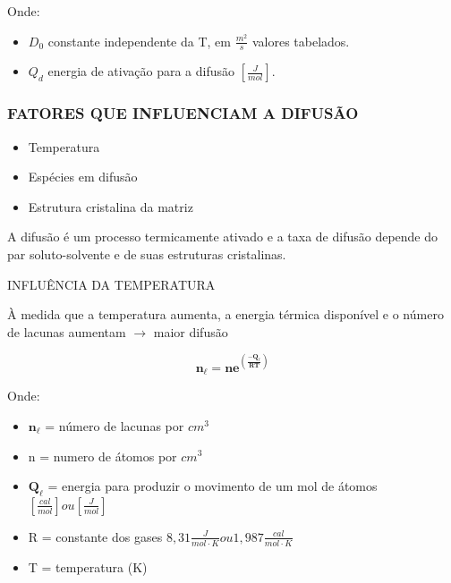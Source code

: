 Onde:


\begin{itemize}
	\item $D_{0}$ constante independente da T, em $\frac{m^{2}}{s}$ valores tabelados.
	\item $Q_{d}$ energia de ativação para a difusão $[\frac{J}{mol}]$.
\end{itemize}

\subsubsection{FATORES QUE INFLUENCIAM A DIFUSÃO}


\begin{itemize}
	\item Temperatura
	\item Espécies em difusão
	\item Estrutura cristalina da matriz
\end{itemize}

A difusão é um processo termicamente ativado e a taxa de difusão depende do par soluto-solvente e de suas estruturas cristalinas.


INFLUÊNCIA DA TEMPERATURA

À medida que a temperatura aumenta, a energia térmica disponível e o número de lacunas aumentam $\rightarrow$ maior difusão

\begin{equation}\label{key}
\mathbf{n}_{\ell}=\mathbf{n} \mathbf{e}^{(\frac{-\mathbf{Q}_{\ell}}{ \mathbf{R} \mathbf{T}})}
\end{equation}

Onde:

\begin{itemize}
	\item $\mathbf{n}_{\ell}$ = número de lacunas por $cm^{3}$
	\item n = numero de átomos por $cm^{3}$
	\item $\mathbf{Q}_{\ell}$ = energia para produzir o movimento de um mol de átomos $[\frac{cal}{mol}] ou [\frac{J}{mol}]$
	\item R = constante dos gases $8,31 \frac{J}{mol \cdot K} ou 1,987 \frac{cal}{mol \cdot K}$
	\item T = temperatura (K)
\end{itemize}

